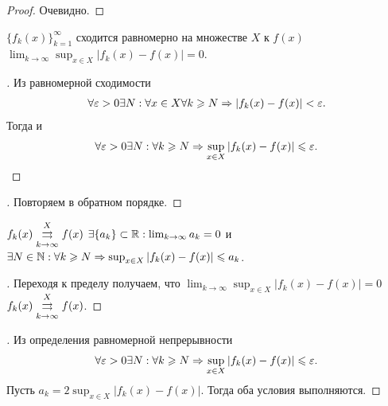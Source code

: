 \documentclass[../main.tex]{subfiles}
\begin{document}
\begin{proof}
  Очевидно.
\end{proof}


\begin{proposition}
  $ \{ f_{k}(x) \}_{k = 1}^{\infty} $ сходится равномерно на множестве $ X$ к $ f(x) $  \nas $ \lim_{k \to \infty} \sup_{x\in X} \left| f_k(x) - f(x)  \right| = 0$.   
\end{proposition}


\begin{proof}[\circled{\hence}]
    Из равномерной сходимости 
    \begin{gather} 
      \forall \eps > 0 \exists N: \forall x \in X \forall k \geq N \hence \left| f_k(x) - f(x)  \right| < \eps .
    \end{gather}
    Тогда и 
    \begin{gather} 
      \forall \eps > 0 \exists N: \forall k \geq N \hence \sup_{x\in X} \left| f_k(x) - f(x)  \right| \leq \eps .
    \end{gather}
\end{proof}


\begin{proof}[\circled{\lhence}]
  Повторяем в обратном порядке.
\end{proof}


\begin{corollary}
  $ f_k(x)  \convergesuniformly{k \to \infty}{X} f(x)$  \nas $ \exists \{ a_k  \} \subset \R: \lim_{k \to \infty} a_k  = 0$ и $\exists N \in \N: \forall k \geq N \hence \sup_{x\in X} \left| f_k(x) - f(x)  \right| \leq a_k$. 
\end{corollary}

\begin{proof}[\circled{\lhence}]
  Переходя к пределу получаем, что $ \lim_{k \to \infty} \sup_{x\in X} \left| f_k(x) - f(x)  \right| = 0$ \nas  $ f_k(x)  \convergesuniformly{k \to \infty}{X} f(x)$.
\end{proof}

\begin{proof}[\circled{\hence}]
  Из определения равномерной непрерывности 
  \begin{gather} 
    \forall \eps > 0 \exists N: \forall k \geq N \hence \sup_{x\in X} \left| f_k(x) - f(x)  \right| \leq \eps .
  \end{gather}
  Пусть $a_k = 2  \sup_{x\in X} \left| f_k(x) - f(x)  \right|$. Тогда оба условия выполняются.
\end{proof}
\end{document}
